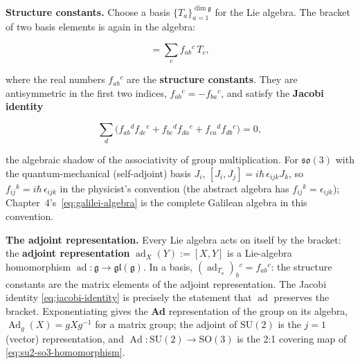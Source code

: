 \medskip\noindent\textbf{Structure constants.} Choose a basis $\{T_{a}\}_{a=1}^{\dim\mathfrak g}$ for the Lie algebra. The bracket of two basis elements is again in the algebra:
\begin{linenomath}
\begin{equation}
[T_{a},T_{b}]=\sum_{c}f_{ab}{}^{c}\,T_{c},
\label{eq:app-structure-constants}
\end{equation}
\end{linenomath}
where the real numbers $f_{ab}{}^{c}$ are the \textbf{structure constants}. They are antisymmetric in the first two indices, $f_{ab}{}^{c}=-f_{ba}{}^{c}$, and satisfy the \textbf{Jacobi identity}
\begin{linenomath}
\begin{equation}
\sum_{d}\bigl(f_{ab}{}^{d}f_{dc}{}^{e}+f_{bc}{}^{d}f_{da}{}^{e}+f_{ca}{}^{d}f_{db}{}^{e}\bigr)=0,
\label{eq:jacobi-identity}
\end{equation}
\end{linenomath}
the algebraic shadow of the associativity of group multiplication. For $\mathfrak{so}(3)$ with the quantum-mechanical (self-adjoint) basis $J_{i}$, $[J_{i},J_{j}]=i\hbar\,\epsilon_{ijk}J_{k}$, so $f_{ij}{}^{k}=i\hbar\,\epsilon_{ijk}$ in the physicist's convention (the abstract algebra has $f_{ij}{}^{k}=\epsilon_{ijk}$); Chapter~4's~\eqref{eq:galilei-algebra} is the complete Galilean algebra in this convention.

\medskip\noindent\textbf{The adjoint representation.} Every Lie algebra acts on itself by the bracket: the \textbf{adjoint representation} $\operatorname{ad}_{X}(Y):=[X,Y]$ is a Lie-algebra homomorphism $\operatorname{ad}:\mathfrak g\to\mathfrak{gl}(\mathfrak g)$. In a basis, $(\operatorname{ad}_{T_{a}})_{b}{}^{c}=f_{ab}{}^{c}$: the structure constants are the matrix elements of the adjoint representation. The Jacobi identity \eqref{eq:jacobi-identity} is precisely the statement that $\operatorname{ad}$ preserves the bracket. Exponentiating gives the \textbf{Ad} representation of the group on its algebra, $\operatorname{Ad}_{g}(X)=gXg^{-1}$ for a matrix group; the adjoint of $\mathrm{SU}(2)$ is the $j=1$ (vector) representation, and $\operatorname{Ad}:\mathrm{SU}(2)\to\mathrm{SO}(3)$ is the 2:1 covering map of \eqref{eq:su2-so3-homomorphism}.

